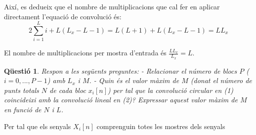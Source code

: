 \documentclass[11pt,a4]{article}
\numberwithin{equation}{section}
\theoremstyle{thmstyle}
\theoremstyle{thmstyle}
\theoremstyle{thmstyle}
\theoremstyle{thmstyle}
\theoremstyle{thmstyle}
\theoremstyle{thmstyle}
\newtheorem{question}{Qüestió}
\begin{document}
Així, es dedueix que el nombre de multiplicacions que cal fer en aplicar directament l'equació de convolució és:
$$
2\sum\limits_{i=1}^{L} i + L(L_x - L - 1) = L(L+1)+L(L_x-L-1)=LL_x
$$

El nombre de multiplicacions per mostra d'entrada és $\frac{LL_x}{L_x}=L$.

\begin{question}
Respon a les següents preguntes:
- Relacionar el número de blocs $P$ ($i=0,...,P-1$) amb $L_x$ i $M$.
- Quin és el valor màxim de $M$ (donat el número de punts totals $N$ de cada bloc $x_i[n]$) per
tal que la convolució circular en (1) coincideixi amb la convolució lineal en (2)?
Expressar aquest valor màxim de $M$ en funció de $N$ i $L$.
\end{question}

Per tal que els senyals $X_i[n]$ comprenguin totes les mostres dels senyals 
\end{document}
